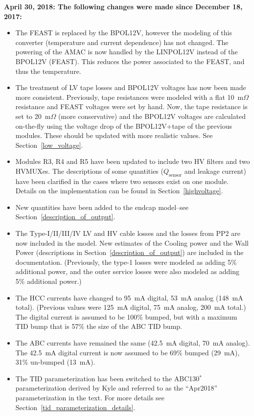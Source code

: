 \documentclass[10pt,]{article}
\begin{document}
{ \bf
April 30, 2018: The following changes were made since December 18, 2017:}
\begin{itemize}
\item The FEAST is replaced by the BPOL12V, however the modeling of this converter (temperature
  and current dependence) has not changed. The powering of the AMAC is now handled by the LINPOL12V
  instead of the BPOL12V (FEAST). This reduces the power associated to the FEAST, and thus the
  temperature.
\item The treatment of LV tape losses and BPOL12V voltages has now been made more consistent. Previously,
  tape resistances were modeled with a flat 10~m$\Omega$ resistance and FEAST voltages were set by hand.
  Now, the tape resistance is set to 20~m$\Omega$ (more conservative) and the
  BPOL12V voltages are calculated on-the-fly using the voltage drop of the BPOL12V+tape of
  the previous modules. These should be updated with more realistic values. See Section~\ref{low_voltage}.
\item Modules R3, R4 and R5 have been updated to include two HV filters and two HVMUXes. The descriptions
  of some quantities ($Q_\text{sensor}$ and leakage current) have been clarified in the cases where two sensors
  exist on one module. Details on the implementation can be found in Section~\ref{highvoltage}.
\item New quantities have been added to the endcap model--see Section~\ref{description_of_output}.
\item The Type-I/II/III/IV LV and HV cable losses and the losses from PP2 are now included in the model. New
  estimates of the Cooling power and the Wall Power (descriptions in Section~\ref{description_of_output})
  are included in the documentation. (Previously, the type-1 losses were modeled as adding 5\% additional power,
  and the outer service losses were also modeled as adding 5\% additional power.)
\item The HCC currents have changed to 95~mA digital, 53~mA analog (148~mA total). (Previous values
  were 125~mA digital, 75~mA analog, 200~mA total.) The digital current is assumed to be 100\% bumped, but
  with a maximum TID bump that is 57\% the size of the ABC TID bump.
\item The ABC currents have remained the same (42.5~mA digital, 70~mA analog).
  The 42.5~mA digital current is now assumed to be 69\% bumped (29~mA), 31\% un-bumped (13~mA).
\item The TID parameterization has been switched to the ABC130$^{*}$ parameterization derived by Kyle
  and referred to as the ``Apr2018'' parameterization in the text. For more details see
  Section~\ref{tid_parameterization_details}.
\end{itemize}
\end{document}
